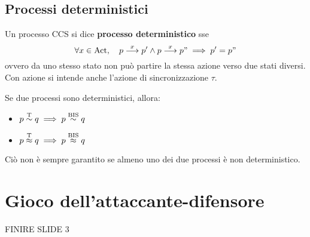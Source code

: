 \subsection*{Processi deterministici}
\begin{defn}
    Un processo CCS si dice \textbf{processo deterministico} sse
    \[
        \forall x \in \text{Act}, \quad
        p \overset{x}{\longrightarrow} p' \land p \overset{x}{\longrightarrow} p" \implies p' = p"
    \]
    ovvero da uno stesso stato non può partire la stessa azione verso due stati
    diversi. Con azione si intende anche l'azione di sincronizzazione $\tau$.
\end{defn}

\begin{defn}
    Se due processi sono deterministici, allora:
    \begin{itemize}
        \item $p \overset{\textnormal{T}}{\sim} q \implies p \overset{\textnormal{BIS}}{\sim} q$
        \item $p \overset{\textnormal{T}}{\approx} q \implies p \overset{\textnormal{BIS}}{\approx} q$
    \end{itemize}
    Ciò non è sempre garantito se almeno uno dei due processi è non deterministico.
\end{defn}



\section{Gioco dell'attaccante-difensore}
FINIRE SLIDE 3
